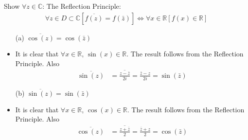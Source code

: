 \documentclass[12pt, english]{book}
\makeatletter
\renewenvironment{proof}[1][\proofname]{\par
	\pushQED{\qed}%
	\normalfont \topsep6\p@\@plus6\p@\relax
	\list{}{%
		\settowidth{\leftmargin}{\itshape\proofname:\hskip\labelsep}%
		\setlength{\labelwidth}{0pt}%
		\setlength{\itemindent}{-\leftmargin}%
	}%
	\item[\hskip\labelsep\itshape#1\@addpunct{:}]\ignorespaces
	}{ \popQED\endlist\@endpefalse}
\makeatother
\begin{document}
	\begin{example}
		Show \(\forall z \in \mathbb{C}\):\newline
		The Reflection Principle:
		\begin{align*}
			\forall z \in D\subset \mathbb{C} [\overline{f(z)} = f(\bar{z})] \iff \forall x \in \mathbb{R}[f(x) \in \mathbb{R}]
		\end{align*}
		\begin{itemize}
			\item[(a)] \(\overline{\cos(z)} = \cos(\bar{z})\) 
			\begin{proof}
			{\color{Grey}
				It is clear that \(\forall x \in \mathbb{R}\), \(\sin(x) \in \mathbb{R}\). The result follows from the Reflection Principle. Also
				\begin{align*}
					\overline{\sin(z)} &= \overline{\frac{z - \bar{z}}{2i}} = \frac{\bar{z} 
						- z}{2i} = \sin(\bar{z})
				\end{align*}
			}
			\end{proof}
			
			\item[(b)] \(\overline{\sin(z)} = \sin(\bar{z})\) 
			\begin{proof}
			{\color{Grey}
				It is clear that \(\forall x \in \mathbb{R}\), \(\cos(x) \in \mathbb{R}\). The result follows from the Reflection Principle. Also
				\begin{align*}
					\overline{\cos(z)} &= \overline{\frac{z + \bar{z}}{2}} = \frac{\bar{z} 
						+ z}{2} = \cos(\bar{z})
				\end{align*}
			}
			\end{proof}
		\end{itemize}
	\end{example}
\end{document}

